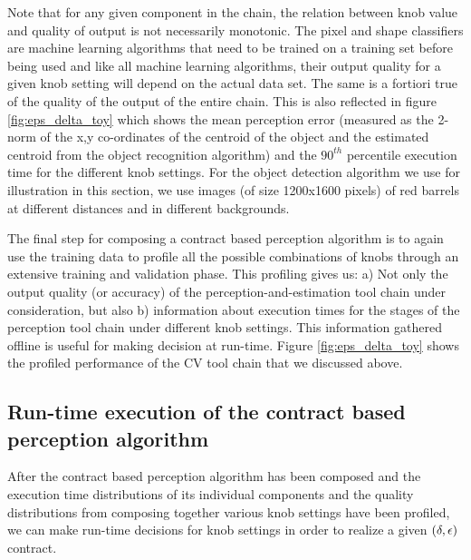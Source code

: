 Note that for any given component in the chain, the relation between knob value and quality of output is not necessarily monotonic. The pixel and shape classifiers are machine learning algorithms that need to be trained on a training set before being used and like all machine learning algorithms, their output quality for a given knob setting will depend on the actual data set.
The same is a fortiori true of the quality of the output of the entire chain. This is also reflected in figure \ref{fig:eps_delta_toy} which shows the mean perception error (measured as the 2-norm of the x,y co-ordinates of the centroid of the object and the estimated centroid from the object recognition algorithm) and the $90^{th}$ percentile execution time for the different knob settings. For the object detection algorithm we use for illustration in this section, we use images (of size 1200x1600 pixels) of red barrels at different distances and in different backgrounds.

The final step for composing a contract based perception algorithm is to again use the training data to profile all the possible combinations of knobs through an extensive training and validation phase. This profiling gives us: a) Not only the output quality (or accuracy) of the perception-and-estimation tool chain under consideration, but also b) information about execution times for the stages of the perception tool chain under different knob settings. This information gathered offline is useful for making decision at run-time. Figure \ref{fig:eps_delta_toy} shows the profiled performance of the CV tool chain that we discussed above.


\subsection{Run-time execution of the contract based perception algorithm}

After the contract based perception algorithm has been composed and the execution time distributions of its individual components and the quality distributions from composing together various knob settings have been profiled, we can make run-time decisions for knob settings in order to realize a given $(\delta,\epsilon)$ contract. 

